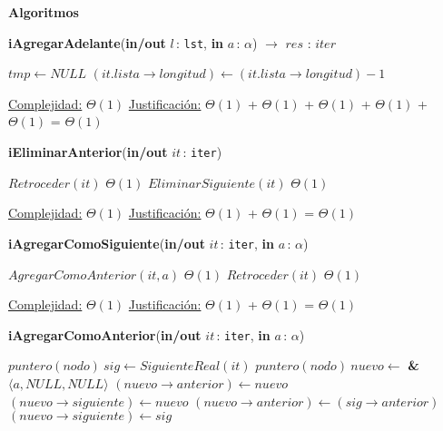 \documentclass[a4paper,10pt]{article}
\let\TipoVariable=\texttt
\let\ModificadorArgumento=\textbf
\newcommand{\In}[2]{\ModificadorArgumento{in} \ensuremath{#1}\,: \TipoVariable{#2}\xspace}
\newcommand{\Inout}[2]{\ModificadorArgumento{in/out} \ensuremath{#1}\,: \TipoVariable{#2}\xspace}
\newenvironment{Algoritmos}{%
  \vspace*{2ex}%
  \noindent\textbf{\Large Algoritmos}%
  \vspace*{2ex}%
}{}
\begin{document}
\begin{Algoritmos}
\begin{







ithm}[H]{\textbf{iAgregarAdelante}(\Inout{l}{lst}, \In{a}{$\alpha$}) $\to$ $res$ : $iter$}
\begin{algorithm}[H]
\begin{algorithmic}[1]
			\State $tmp \gets NULL$	 
			\State $(it.lista\rightarrow longitud) \gets (it.lista\rightarrow longitud) - 1$

			\medskip
			\Statex \underline{Complejidad:} $\Theta(1)$
			\Statex \underline{Justificación:} $\Theta(1)$ + $\Theta(1)$ + $\Theta(1)$ + $\Theta(1)$ + $\Theta(1)$ =  $\Theta(1)$
    	\end{algorithmic}
\end{algorithm}

	
\begin{algorithm}[H]
	\begin{algorithmic}[1]
		\State \textbf{iEliminarAnterior}(\Inout{it}{iter})
		
			\State $Retroceder(it)$	\Comment $\Theta(1)$
			\State $EliminarSiguiente(it)$	\Comment $\Theta(1)$

			\medskip
			\Statex \underline{Complejidad:} $\Theta(1)$
			\Statex \underline{Justificación:} $\Theta(1)$ + $\Theta(1)$ = $\Theta(1)$
    	\end{algorithmic}
\end{algorithm}


\begin{algorithm}[H]
	\begin{algorithmic}[1]
		\State \textbf{iAgregarComoSiguiente}(\Inout{it}{iter}, \In{a}{$\alpha$})
		
			\State $AgregarComoAnterior(it, a)$		\Comment $\Theta(1)$
			\State $Retroceder(it)$	\Comment $\Theta(1)$

			\medskip
			\Statex \underline{Complejidad:} $\Theta(1)$
			\Statex \underline{Justificación:} $\Theta(1)$ + $\Theta(1)$ = $\Theta(1)$
    	\end{algorithmic}
\end{algorithm}
	

\begin{algorithm}[H]
	\begin{algorithmic}[1]
		\State \textbf{iAgregarComoAnterior}(\Inout{it}{iter}, \In{a}{$\alpha$})
		
			\State $puntero(nodo) \ sig \gets SiguienteReal(it)$
			\State $puntero(nodo) \ nuevo \gets $ \textbf{\&} $\langle a, NULL, NULL \rangle$ 
				\State $(nuevo\rightarrow anterior) \gets nuevo$
				\State $(nuevo\rightarrow siguiente) \gets nuevo$
			\Else
				\State $(nuevo\rightarrow anterior) \gets (sig\rightarrow anterior)$
				\State $(nuevo\rightarrow siguiente) \gets sig$
			\EndIf
			

\end{algorithmic}
\end{algorithm}
\end{







ithm}
\end{Algoritmos}
\end{document}
